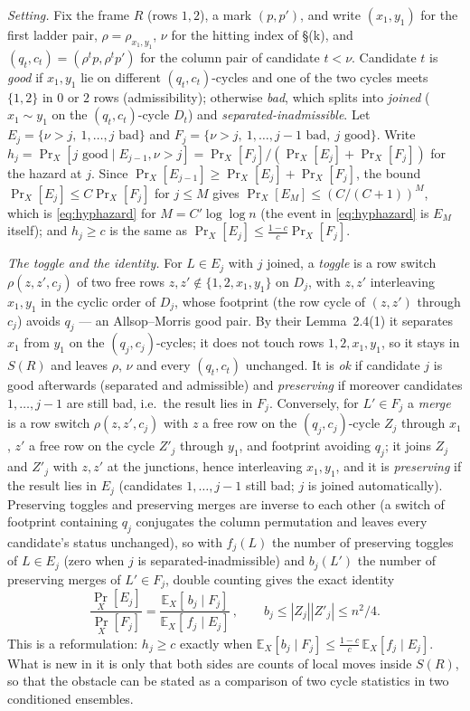 \emph{Setting.}  Fix the frame $R$ (rows $1,2$), a mark $(p,p')$, and
write $(x_1,y_1)$ for the first ladder pair, $\rho=\rho_{x_1,y_1}$,
$\nu$ for the hitting index of \S(k), and $(q_t,c_t)=(\rho^tp,\rho^tp')$
for the column pair of candidate $t<\nu$.  Candidate $t$ is \emph{good}
if $x_1,y_1$ lie on different $(q_t,c_t)$-cycles and one of the two
cycles meets $\{1,2\}$ in $0$ or $2$ rows (admissibility); otherwise
\emph{bad}, which splits into \emph{joined} ($x_1\sim y_1$ on the
$(q_t,c_t)$-cycle $D_t$) and \emph{separated-inadmissible}.  Let
$E_j=\{\nu>j,\ 1,\dots,j\text{ bad}\}$ and
$F_j=\{\nu>j,\ 1,\dots,j-1\text{ bad},\ j\text{ good}\}$.  Write $h_j=\Pr_X[j\text{ good}\mid E_{j-1},\nu>j]=\Pr_X[F_j]/(\Pr_X[E_j]+\Pr_X[F_j])$
for the hazard at $j$.  Since $\Pr_X[E_{j-1}]\ge\Pr_X[E_j]+\Pr_X[F_j]$,
the bound $\Pr_X[E_j]\le C\Pr_X[F_j]$ for $j\le M$ gives
$\Pr_X[E_M]\le(C/(C+1))^M$, which is \eqref{eq:hyphazard} for
$M=C'\log\log n$ (the event in \eqref{eq:hyphazard} is $E_M$ itself);
and $h_j\ge c$ is the same as $\Pr_X[E_j]\le\frac{1-c}{c}\Pr_X[F_j]$.

\emph{The toggle and the identity.}  For $L\in E_j$ with $j$ joined, a
\emph{toggle} is a row switch $\rho(z,z',c_j)$ of two free rows
$z,z'\notin\{1,2,x_1,y_1\}$ on $D_j$, with $z,z'$ interleaving
$x_1,y_1$ in the cyclic order of $D_j$, whose footprint (the row cycle
of $(z,z')$ through $c_j$) avoids $q_j$ --- an Allsop--Morris good pair.
By their Lemma~2.4(1) it separates $x_1$ from $y_1$ on the
$(q_j,c_j)$-cycles; it does not touch rows $1,2,x_1,y_1$, so it stays
in $S(R)$ and leaves $\rho$, $\nu$ and every $(q_t,c_t)$ unchanged.  It
is \emph{ok} if candidate $j$ is good afterwards (separated and
admissible) and \emph{preserving} if moreover candidates $1,\dots,j-1$
are still bad, i.e.\ the result lies in $F_j$.  Conversely, for $L'\in
F_j$ a \emph{merge} is a row switch $\rho(z,z',c_j)$ with $z$ a free
row on the $(q_j,c_j)$-cycle $Z_j$ through $x_1$, $z'$ a free row on
the cycle $Z'_j$ through $y_1$, and footprint avoiding $q_j$; it joins
$Z_j$ and $Z'_j$ with $z,z'$ at the junctions, hence interleaving
$x_1,y_1$, and it is \emph{preserving} if the result lies in $E_j$
(candidates $1,\dots,j-1$ still bad; $j$ is joined automatically).
Preserving toggles and preserving merges are inverse to each other
(a switch of footprint containing $q_j$ conjugates the column
permutation and leaves every candidate's status unchanged), so with $f_j(L)$ the number of
preserving toggles of $L\in E_j$ (zero when $j$ is
separated-inadmissible) and $b_j(L')$ the number of preserving merges
of $L'\in F_j$, double counting gives the exact identity
\begin{equation}\label{eq:hazardratio}
\frac{\Pr_X[E_j]}{\Pr_X[F_j]}
=\frac{\mathbb E_X[\,b_j\mid F_j]}{\mathbb E_X[\,f_j\mid E_j]}\,,\qquad
b_j\le|Z_j||Z'_j|\le n^2/4 .
\end{equation}
This is a reformulation: $h_j\ge c$ exactly when
$\mathbb E_X[b_j\mid F_j]\le\frac{1-c}{c}\,\mathbb E_X[f_j\mid E_j]$.  What is new in it is only
that both sides are counts of local moves inside $S(R)$, so that the
obstacle can be stated as a comparison of two cycle statistics in two
conditioned ensembles.

